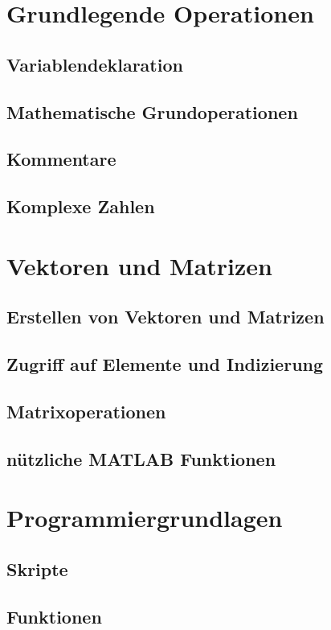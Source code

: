 \documentclass[12pt, a4paper, twoside]{article}
\begin{document}
    \section{Grundlegende Operationen}
        \subsection{Variablendeklaration}
        \subsection{Mathematische Grundoperationen}
        \subsection{Kommentare}
        \subsection{Komplexe Zahlen}
    \section{Vektoren und Matrizen}
        \subsection{Erstellen von Vektoren und Matrizen}
        \subsection{Zugriff auf Elemente und Indizierung}
        \subsection{Matrixoperationen}
        \subsection{nützliche MATLAB Funktionen}
    \section{Programmiergrundlagen}
        \subsection{Skripte}
        \subsection{Funktionen}
\end{document}
